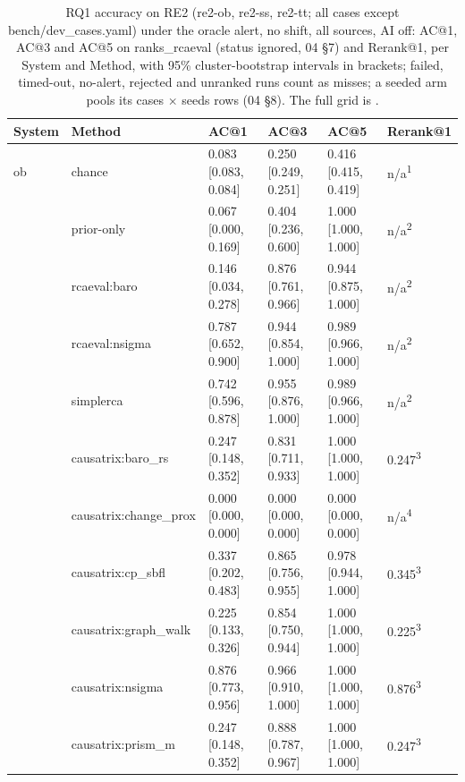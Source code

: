 \begin{table}[t]
\centering
\caption{RQ1 accuracy on RE2 (re2-ob, re2-ss, re2-tt; all cases except bench/dev\_cases.yaml) under the oracle alert, no shift, all sources, AI off: AC@1, AC@3 and AC@5 on ranks\_rcaeval (status ignored, 04 \S{}7) and Rerank@1, per System and Method, with 95\% cluster-bootstrap intervals in brackets; failed, timed-out, no-alert, rejected and unranked runs count as misses; a seeded arm pools its cases $\times$ seeds rows (04 \S{}8). The full grid is .}
\label{tab:t05-rq1-re2-oracle-paper}
\footnotesize
\setlength{\tabcolsep}{3pt}%
\begin{tabular}{@{}llllll@{}}
\hline
System & Method & AC@1 & AC@3 & AC@5 & Rerank@1 \\
\hline
ob & chance & 0.083 [0.083, 0.084] & 0.250 [0.249, 0.251] & 0.416 [0.415, 0.419] & n/a\textsuperscript{1} \\
 & prior-only & 0.067 [0.000, 0.169] & 0.404 [0.236, 0.600] & 1.000 [1.000, 1.000] & n/a\textsuperscript{2} \\
 & rcaeval:baro & 0.146 [0.034, 0.278] & 0.876 [0.761, 0.966] & 0.944 [0.875, 1.000] & n/a\textsuperscript{2} \\
 & rcaeval:nsigma & 0.787 [0.652, 0.900] & 0.944 [0.854, 1.000] & 0.989 [0.966, 1.000] & n/a\textsuperscript{2} \\
 & simplerca & 0.742 [0.596, 0.878] & 0.955 [0.876, 1.000] & 0.989 [0.966, 1.000] & n/a\textsuperscript{2} \\
 & causatrix:baro\_rs & 0.247 [0.148, 0.352] & 0.831 [0.711, 0.933] & 1.000 [1.000, 1.000] & 0.247\textsuperscript{3} \\
 & causatrix:change\_prox & 0.000 [0.000, 0.000] & 0.000 [0.000, 0.000] & 0.000 [0.000, 0.000] & n/a\textsuperscript{4} \\
 & causatrix:cp\_sbfl & 0.337 [0.202, 0.483] & 0.865 [0.756, 0.955] & 0.978 [0.944, 1.000] & 0.345\textsuperscript{3} \\
 & causatrix:graph\_walk & 0.225 [0.133, 0.326] & 0.854 [0.750, 0.944] & 1.000 [1.000, 1.000] & 0.225\textsuperscript{3} \\
 & causatrix:nsigma & 0.876 [0.773, 0.956] & 0.966 [0.910, 1.000] & 1.000 [1.000, 1.000] & 0.876\textsuperscript{3} \\
 & causatrix:prism\_m & 0.247 [0.148, 0.352] & 0.888 [0.787, 0.967] & 1.000 [1.000, 1.000] & 0.247\textsuperscript{3} \\

\end{tabular}
\end{table}
